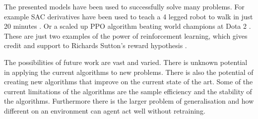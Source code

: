 The presented models have been used to successfully solve many problems. For example SAC derivatives have been used to teach a 4 legged robot to walk in just 20 minutes \cite{smithWalkParkLearning2022}. Or a scaled up PPO algorithm beating world champions at Dota 2 \cite{openaiDota2Large2019}. These are just two examples of the power of reinforcement learning, which gives credit and support to Richards Sutton's reward hypothesis \cite{suttonReinforcementLearningSecond2018}.

The possibilities of future work are vast and varied. There is unknown potential in applying the current algorithms to new problems. There is also the potential of creating new algorithms that improve on the current state of the art. Some of the current limitations of the algorithms are the sample efficiency and the stability of the algorithms. Furthermore there is the larger problem of generalisation and how different on an environment can agent act well without retraining.
